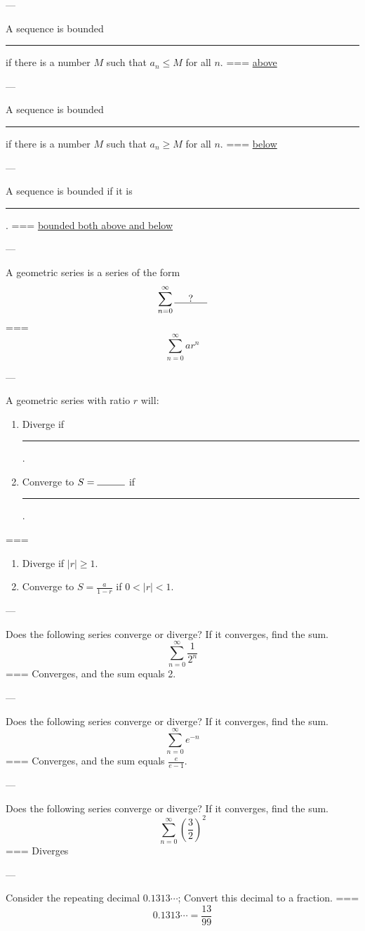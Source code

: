 ---

A sequence is bounded \rule{1cm}{0.15mm} if there is a number \(M\) such that
\(a_n\leq M\) for all \(n\).
===
\underline{above}

---

A sequence is bounded \rule{1cm}{0.15mm} if there is a number \(M\) such that
\(a_n\geq M\) for all \(n\).
===
\underline{below}

---

A sequence is bounded if it is\\
\rule{1\linewidth}{0.15mm}.
===
\underline{bounded both above and below}

---

A geometric series is a series of the form
\[\sum_{n=0}^\infty\underline{\text{\hspace{0.5cm}?\hspace{0.5cm}}}\]
===
\[\sum_{n=0}^\infty ar^n\]

---

A geometric series with ratio \(r\) will:
\begin{enumerate}
  \item Diverge if \rule{1cm}{0.15mm}.
  \item Converge to \(S=\rule{1cm}{0.15mm}\) if \rule{1cm}{0.15mm}.
\end{enumerate}
===
\begin{enumerate}
  \item Diverge if \(|r|\geq 1\).
  \item Converge to \(\displaystyle S=\frac{a}{1-r}\) if
    \(0<|r|<1\).
\end{enumerate}

---

Does the following series converge or diverge? If it converges, find the sum.
\[\sum_{n=0}^\infty \frac{1}{2^n}\]
===
Converges, and the sum equals 2.

---

Does the following series converge or diverge? If it converges, find the sum.
\[\sum_{n=0}^\infty e^{-n}\]
===
Converges, and the sum equals \(\frac{e}{e-1}\).

---

Does the following series converge or diverge? If it converges, find the sum.
\[\sum_{n=0}^\infty {\left(\frac{3}{2}\right)}^2\]
===
Diverges

---

Consider the repeating decimal \(0.1313\cdots\); Convert this decimal to a
fraction.
===
\[0.1313\cdots=\frac{13}{99}\]
